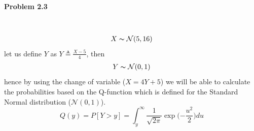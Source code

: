 \documentclass[12pt, letterpaper]{scrartcl}
\begin{document}
\paragraph*{Problem 2.3} \hfill\\
\begin{align*}
    X\thicksim\mathcal{N}(5, 16)
\end{align*}
let us define $Y$ as $Y\triangleq\frac{X-5}{4}$, then
\begin{align*}
    Y\thicksim\mathcal{N}(0, 1)
\end{align*}
hence by using the change of variable ($X=4Y+5$) we will be able to calculate the probabilities based on the Q-function which is defined for the Standard Normal distribution ($\mathcal{N}(0, 1)$).
\begin{equation*}
    Q(y)=P[Y>y]=\int_y^\infty\frac{1}{\sqrt{2\pi}}\exp({-\frac{u^2}{2})du}
\end{equation*}
\end{document}
